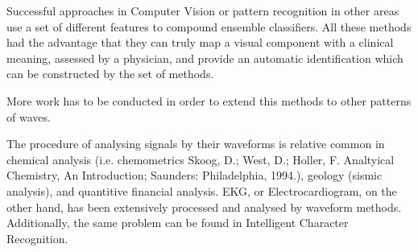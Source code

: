 \documentclass[sensors,article,submit,moreauthors,pdftex,10pt,a4paper]{mdpi}
\begin{document}
Successful approaches in Computer Vision or pattern recognition in other areas use a set of different features to compound ensemble classifiers.  All these methods had the advantage that they can truly map a visual component with a clinical meaning, assessed by a physician, and provide an automatic identification which can be constructed by the set of methods.  

More work has to be conducted in order to extend this methods to other patterns of waves.

The procedure of analysing signals by their waveforms is relative common in chemical analysis (i.e. chemometrics Skoog, D.; West, D.; Holler, F. Analtyical Chemistry, An Introduction; Saunders: Philadelphia, 1994.), geology (sismic analysis), and quantitive financial analysis.  EKG, or Electrocardiogram, on the other hand, has been extensively processed and analysed by waveform methods.
Additionally, the same problem can be found in Intelligent Character Recognition.


%
%
%
%



\vspace{6pt} 

\end{document}
